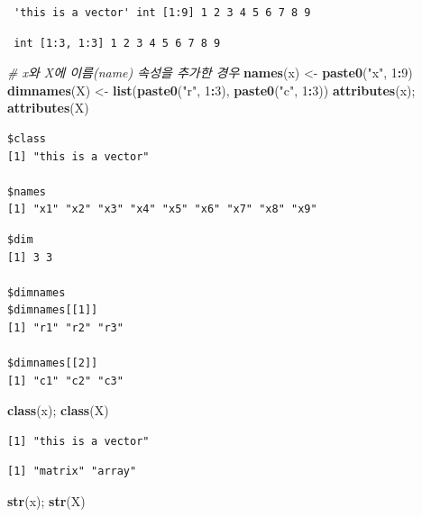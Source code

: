 \documentclass[
  11pt,
]{krantz}
\newenvironment{Shaded}{\begin{snugshade}}{\end{snugshade}}
\newcommand{\CommentTok}[1]{\textcolor[rgb]{0.37,0.37,0.37}{\textit{#1}}}
\newcommand{\DecValTok}[1]{\textcolor[rgb]{0.06,0.06,0.06}{#1}}
\newcommand{\KeywordTok}[1]{\textcolor[rgb]{0.27,0.27,0.27}{\textbf{#1}}}
\newcommand{\NormalTok}[1]{#1}
\newcommand{\OperatorTok}[1]{\textcolor[rgb]{0.43,0.43,0.43}{\textbf{#1}}}
\newcommand{\StringTok}[1]{\textcolor[rgb]{0.5,0.5,0.5}{#1}}
\begin{document}
\begin{verbatim}
 'this is a vector' int [1:9] 1 2 3 4 5 6 7 8 9
\end{verbatim}

\begin{verbatim}
 int [1:3, 1:3] 1 2 3 4 5 6 7 8 9
\end{verbatim}

\begin{Shaded}
\begin{Highlighting}[]
\CommentTok{# x와 X에 이름(name) 속성을 추가한 경우}
\KeywordTok{names}\NormalTok{(x) <-}\StringTok{ }\KeywordTok{paste0}\NormalTok{(}\StringTok{"x"}\NormalTok{, }\DecValTok{1}\OperatorTok{:}\DecValTok{9}\NormalTok{)}
\KeywordTok{dimnames}\NormalTok{(X) <-}\StringTok{ }\KeywordTok{list}\NormalTok{(}\KeywordTok{paste0}\NormalTok{(}\StringTok{"r"}\NormalTok{, }\DecValTok{1}\OperatorTok{:}\DecValTok{3}\NormalTok{), }
                    \KeywordTok{paste0}\NormalTok{(}\StringTok{"c"}\NormalTok{, }\DecValTok{1}\OperatorTok{:}\DecValTok{3}\NormalTok{))}
\KeywordTok{attributes}\NormalTok{(x); }\KeywordTok{attributes}\NormalTok{(X)}
\end{Highlighting}
\end{Shaded}

\begin{verbatim}
$class
[1] "this is a vector"

$names
[1] "x1" "x2" "x3" "x4" "x5" "x6" "x7" "x8" "x9"
\end{verbatim}

\begin{verbatim}
$dim
[1] 3 3

$dimnames
$dimnames[[1]]
[1] "r1" "r2" "r3"

$dimnames[[2]]
[1] "c1" "c2" "c3"
\end{verbatim}

\begin{Shaded}
\begin{Highlighting}[]
\KeywordTok{class}\NormalTok{(x); }\KeywordTok{class}\NormalTok{(X)}
\end{Highlighting}
\end{Shaded}

\begin{verbatim}
[1] "this is a vector"
\end{verbatim}

\begin{verbatim}
[1] "matrix" "array" 
\end{verbatim}

\begin{Shaded}
\begin{Highlighting}[]
\KeywordTok{str}\NormalTok{(x); }\KeywordTok{str}\NormalTok{(X)}
\end{Highlighting}
\end{Shaded}
\end{document}
